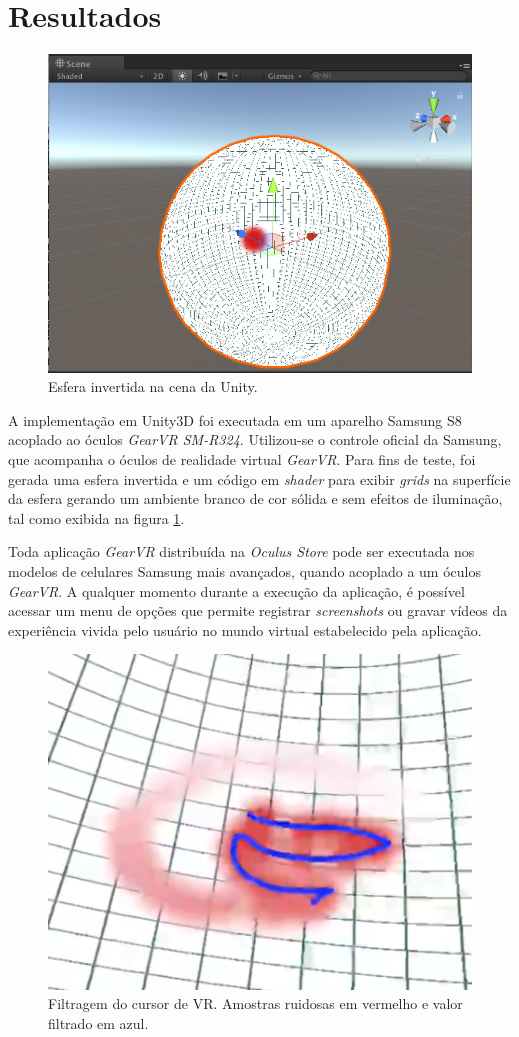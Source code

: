 \documentclass[conference]{IEEEtran}
\begin{document}
\section{Resultados} \label{sec:results}

\begin{figure}[ht]
\centering
\includegraphics[width=.5\textwidth]{images/sphere.png}
\caption{Esfera invertida na cena da Unity.}
\label{fig:invertsphere}
\end{figure}

A implementação em Unity3D foi executada em um aparelho Samsung S8 acoplado ao óculos \textit{GearVR SM-R324}. Utilizou-se o controle oficial da Samsung, que acompanha o óculos de realidade virtual \textit{GearVR}. Para fins de teste, foi gerada uma esfera invertida e um código em \textit{shader} para exibir \textit{grids} na superfície da esfera gerando um ambiente branco de cor sólida e sem efeitos de iluminação, tal como exibida na figura \ref{fig:invertsphere}.

Toda aplicação \textit{GearVR} distribuída na \textit{Oculus Store} \cite{gearvrstore} pode ser executada nos modelos de celulares Samsung mais avançados, quando acoplado a um óculos \textit{GearVR}. A qualquer momento durante a execução da aplicação, é possível acessar um menu de opções que permite registrar \textit{screenshots} ou gravar vídeos da experiência vivida pelo usuário no mundo virtual estabelecido pela aplicação.

\begin{figure}[ht]
\centering
\includegraphics[width=.5\textwidth]{images/image_01.png}
\caption{Filtragem do cursor de VR. Amostras ruidosas em vermelho e valor filtrado em azul.}
\label{fig:filter01}
\end{figure}
\end{document}
